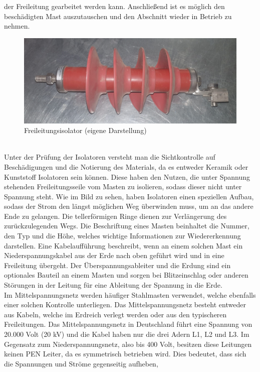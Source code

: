 der Freileitung gearbeitet werden kann. Anschließend ist es möglich den beschädigten Mast auszutauschen und den Abschnitt wieder in Betrieb zu nehmen. 
\begin{figure}[hbt]
    \centering
    \includegraphics[width=0.98\linewidth]{images/Isolator}
    \caption[Isolator]{Freileitungsisolator (eigene Darstellung)}
    \label{fig:Isolator}
\end{figure}
\\Unter der Prüfung der Isolatoren versteht man die Sichtkontrolle auf Beschädigungen und die Notierung des Materials, da es entweder Keramik oder Kunststoff 
Isolatoren sein können. Diese haben den Nutzen, die unter Spannung stehenden Freileitungsseile vom Masten zu isolieren, sodass dieser nicht unter Spannung 
steht. Wie im Bild zu sehen, haben Isolatoren einen speziellen Aufbau, sodass der Strom den längst möglichen Weg überwinden muss, um an das andere Ende zu 
gelangen. Die tellerförmigen Ringe dienen zur Verlängerung des zurückzulegenden Wegs. Die Beschriftung eines Masten beinhaltet die Nummer, den Typ und die 
Höhe, welches wichtige Informationen zur Wiedererkennung darstellen. Eine Kabelaufführung beschreibt, wenn an einem solchen Mast ein Niederspannungskabel 
aus der Erde nach oben geführt wird und in eine Freileitung übergeht. Der Überspannungsableiter und die Erdung sind ein optionales Bauteil an einem Masten 
und sorgen bei Blitzeinschlag oder anderen Störungen in der Leitung für eine Ableitung der Spannung in die Erde.
\\
Im Mittelspannungsnetz werden häufiger Stahlmasten verwendet, welche ebenfalls einer solchen Kontrolle unterliegen. Das Mittelspannungsnetz besteht entweder aus Kabeln, 
welche im Erdreich verlegt werden oder aus den typischeren Freileitungen. Das Mittelspannungsnetz in Deutschland führt eine Spannung von 20.000 Volt (20 kV) 
und die Kabel haben nur die drei Adern L1, L2 und L3. Im Gegensatz zum Niederspannungsnetz, also bis 400 Volt, besitzen diese Leitungen keinen PEN Leiter, da 
es symmetrisch betrieben wird. Dies bedeutet, dass sich die Spannungen und Ströme gegenseitig aufheben, 
